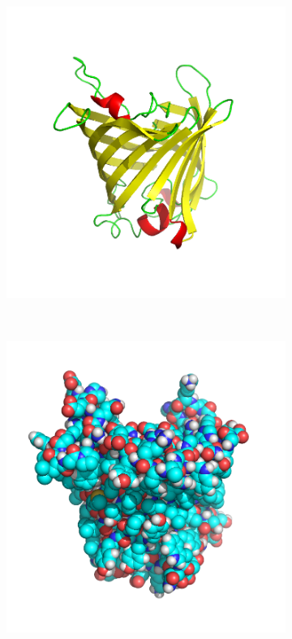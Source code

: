 \begin{figure}
\begin{subfigure}{.5\textwidth}
  {\includegraphics[width=\linewidth]{./figures/ch1/cartoon_representation}}    
    \label{Fig:cartoon_representation}
  \caption{}
  \end{subfigure}%
  \\[\baselineskip]
  \begin{subfigure}{.5\textwidth}
  \centering
  {\includegraphics[width=\linewidth]{./figures/ch1/vdw_representation}}

\end{subfigure}
\end{figure}
